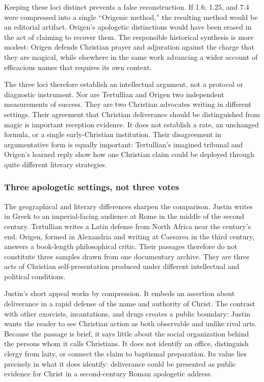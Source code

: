 Keeping these loci distinct prevents a false reconstruction. If 1.6, 1.25,
and 7.4 were compressed into a single ``Origenic method,'' the resulting
method would be an editorial artifact. Origen's apologetic distinctions would
have been erased in the act of claiming to recover them. The responsible
historical synthesis is more modest: Origen defends Christian prayer and
adjuration against the charge that they are magical, while elsewhere in the
same work advancing a wider account of efficacious names that requires its own
context.

The three loci therefore establish an intellectual argument, not a protocol
or diagnostic instrument. Nor are Tertullian and Origen two independent
measurements of success. They
are two Christian advocates writing in different settings. Their agreement
that Christian deliverance should be distinguished from magic is important
reception evidence. It does not establish a rate, an unchanged formula, or a
single early-Christian institution. Their disagreement in argumentative form
is equally important: Tertullian's imagined tribunal and Origen's learned
reply show how one Christian claim could be deployed through quite different
literary strategies.

\subsubsection{Three apologetic settings, not three votes}

The geographical and literary differences sharpen the comparison. Justin
writes in Greek to an imperial-facing audience at Rome in the middle of the
second century. Tertullian writes a Latin defense from North Africa near the
century's end. Origen, formed in Alexandria and writing at Caesarea in the
third century, answers a book-length philosophical critic. Their passages
therefore do not constitute three samples drawn from one documentary archive.
They are three acts of Christian self-presentation produced under different
intellectual and political conditions.

Justin's short appeal works by compression. It embeds an assertion about
deliverance in a rapid defense of the name and authority of Christ. The
contrast with other exorcists, incantations, and drugs creates a public
boundary: Justin wants the reader to see Christian action as both observable
and unlike rival arts. Because the passage is brief, it says little about the
social organization behind the persons whom it calls Christians. It does not
identify an office, distinguish clergy from laity, or connect the claim to
baptismal preparation. Its value lies precisely in what it does identify:
deliverance could be presented as public evidence for Christ in a
second-century Roman apologetic address.

